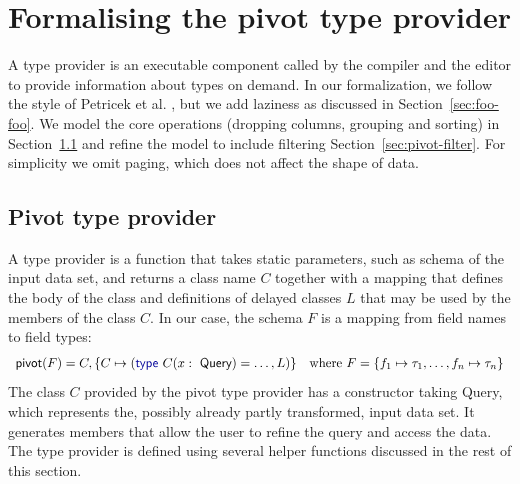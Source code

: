 \documentclass[a4paper,UKenglish]{lipics-v2016}
\theoremstyle{plain}
\theoremstyle{definition}
\newcommand{\kvd}[1]{\textnormal{\textcolor{kvdclr}{\sffamily #1}}}
\newcommand{\ident}[1]{\textnormal{\sffamily #1}}
\begin{document}

\section{Formalising the pivot type provider}
\label{sec:pivot}

A type provider is an executable component called by the compiler and the editor to 
provide information about types on demand. In our formalization, we follow the 
style of Petricek et al. \cite{fsdata}, but we add laziness as discussed in Section~\ref{sec:foo-foo}.
We model the core operations (dropping columns, grouping and sorting) in Section~\ref{sec:pivot-core}
and refine the model to include filtering Section~\ref{sec:pivot-filter}.
For simplicity we omit paging, which does not affect the shape of data.


\subsection{Pivot type provider}
\label{sec:pivot-core}

A type provider is a function that takes static parameters, such as schema of the input data set, 
and returns a class name $C$ together with a mapping that defines the body of the class and 
definitions of delayed classes $L$ that may be used by the members of the class $C$. 
In our case, the schema $F$ is a mapping from field names to field types:
%
\begin{equation*}
\begin{array}{l}
\ident{pivot}(F) = C, \{ C \mapsto (\kvd{type}~C(x:\ident{Query}) = \ldots,L) \} \quad \textnormal{where}~F=\{ f_1 \mapsto \tau_1, \ldots, f_n \mapsto \tau_n \}
\end{array}
\end{equation*}
%
The class $C$ provided by the pivot type provider has a constructor taking \ident{Query}, which 
represents the, possibly already partly transformed, input data set. It generates members that
allow the user to refine the query and access the data. The type provider is defined using several
helper functions discussed in the rest of this section.
\end{document}
